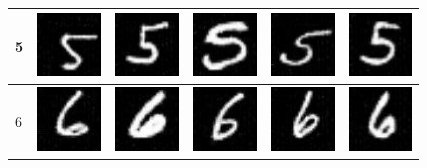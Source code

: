 \begin{table}[ht]
\begin{tabular}{|llllll|}
5 & \includegraphics[width=1.69cm, height=1.69cm]{Files/MNIST/0-5.png}  &\includegraphics[width=1.69cm, height=1.69cm]{Files/MNIST/1-7.png}   & \includegraphics[width=1.69cm, height=1.69cm]{Files/MNIST/3-1.png}  & \includegraphics[width=1.69cm, height=1.69cm]{Files/MNIST/5-5.png}  & \includegraphics[width=1.69cm, height=1.69cm]{Files/MNIST/6-7.png} \\ \hline

6 & \includegraphics[width=1.69cm, height=1.69cm]{Files/MNIST/0-6.png}  &\includegraphics[width=1.69cm, height=1.69cm]{Files/MNIST/2-0.png}   & \includegraphics[width=1.69cm, height=1.69cm]{Files/MNIST/3-2.png}  & \includegraphics[width=1.69cm, height=1.69cm]{Files/MNIST/5-6.png}  & \includegraphics[width=1.69cm, height=1.69cm]{Files/MNIST/7-0.png} \\ \hline


\end{tabular}
\end{table}
